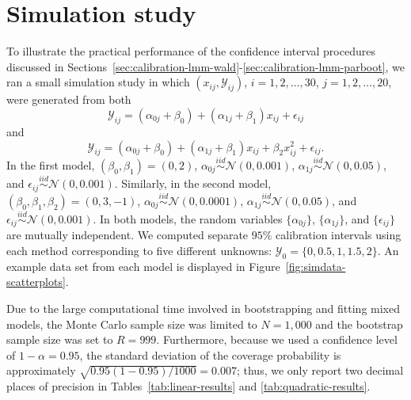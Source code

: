 \documentclass[cmfont,usenames,dvipsnames,leqno]{afit-etd}\usepackage[]{graphicx}\usepackage[]{color}
\begin{document}
\section{Simulation study}
\label{sec:simulation-study}
To illustrate the practical performance of the confidence interval procedures discussed in Sections~\ref{sec:calibration-lmm-wald}-\ref{sec:calibration-lmm-parboot}, we ran a small simulation study in which $\left(x_{ij}, \mathcal{Y}_{ij}\right)$, $i = 1, 2, \dotsc, 30$, $j = 1, 2, \dotsc, 20$, were generated from both
\begin{equation*}
  \mathcal{Y}_{ij} = \left(\alpha_{0j} + \beta_0\right) + \left(\alpha_{1j} + \beta_1\right)x_{ij} + \epsilon_{ij}
\end{equation*}
and
\begin{equation*}
  \mathcal{Y}_{ij} = \left(\alpha_{0j} + \beta_0\right) + \left(\alpha_{1j} + \beta_1\right)x_{ij} + \beta_2 x_{ij}^2 + \epsilon_{ij}.
\end{equation*}
In the first model, $\left(\beta_0, \beta_1\right) = \left(0, 2\right)$, $\alpha_{0j} \stackrel{iid}{\sim} \mathcal{N}\left(0, 0.001\right)$, $\alpha_{1j} \stackrel{iid}{\sim} \mathcal{N}\left(0, 0.05\right)$, and $\epsilon_{ij} \stackrel{iid}{\sim} \mathcal{N}\left(0, 0.001\right)$. Similarly, in the second model, $\left(\beta_0, \beta_1, \beta_2\right) = \left(0, 3, -1\right)$, $\alpha_{0j} \stackrel{iid}{\sim} \mathcal{N}\left(0, 0.0001\right)$, $\alpha_{1j} \stackrel{iid}{\sim} \mathcal{N}\left(0, 0.05\right)$, and $\epsilon_{ij} \stackrel{iid}{\sim} \mathcal{N}\left(0, 0.001\right)$. In both models, the random variables $\big\{\alpha_{0j}\big\}$, $\big\{\alpha_{1j}\big\}$, and $\big\{\epsilon_{ij}\big\}$ are mutually independent. We computed separate $95\%$ calibration intervals using each method corresponding to five different unknowns: $\mathcal{Y}_0 = \big\{0, 0.5, 1, 1.5, 2\big\}$. An example data set from each model is displayed in Figure~\ref{fig:simdata-scatterplots}.

Due to the large computational time involved in bootstrapping and fitting mixed models, the Monte Carlo sample size was limited to $N = 1,000$ and the bootstrap sample size was set to $R = 999$. Furthermore, because we used a confidence level of $1-\alpha = 0.95$, the standard deviation of the coverage probability is approximately $\sqrt{0.95\left(1-0.95\right)/1000} = 0.007$; thus, we only report two decimal places of precision in Tables~\ref{tab:linear-results} and \ref{tab:quadratic-results}. 
\end{document}
